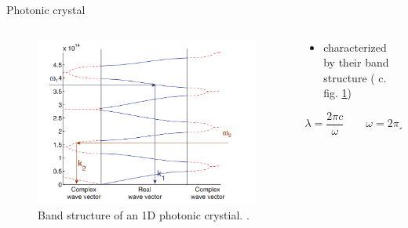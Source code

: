 \begin{frame}{Photonic crystal}

  \begin{columns}

    \begin{column}{0.49\textwidth}
      \begin{figure}
        \centering
        \includegraphics[width=1\textwidth]{./bilder/band_structure.png}
        \caption{Band structure of an 1D photonic crystial. \cite{intro_pho}.}
        \label{fig: band_structure}
      \end{figure}
    \end{column}

    \begin{column}{0.49\textwidth}
    \begin{itemize}
      \setlength\itemsep{1.2em}
      \item{ characterized by their band structure ( c. fig. \ref{fig: band_structure}) }
    \end{itemize}
    \begin{equation*}
      \lambda=\frac{2\pi c}{\omega}\qquad \omega =2\pi f
    \end{equation*}
    \end{column}

  \end{columns}

\end{frame}

